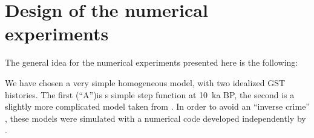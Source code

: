 \documentclass[cp]{copernicus}
\begin{document}
% 
% 
% 

\section{Design of the numerical experiments}
\label{sec:design}

The general idea for the numerical experiments presented here is the following:

We have chosen a very simple homogeneous model, with two idealized GST histories. The first 
(``A'')is s simple step function at 10~ka BP, the second is a slightly more complicated model taken 
from \cite{Balling1981a}. In order to avoid an ``inverse crime'' \cite[see][]{Kaipio2005a}, these 
models were simulated with a numerical code developed independently by \citet{Heckenbach2019a}.
\end{document}
